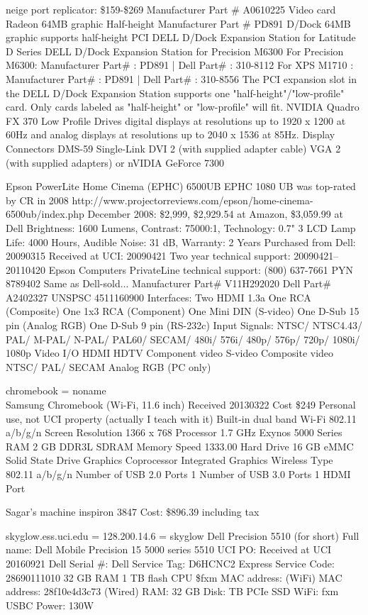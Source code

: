 \documentclass[12pt,twoside]{article}
\begin{document}
neige port replicator: \$159-\$269
Manufacturer Part \# A0610225 Video card Radeon 64MB graphic Half-height 
Manufacturer Part \# PD891 D/Dock 64MB graphic supports half-height PCI
DELL D/Dock Expansion Station for Latitude D Series
DELL D/Dock Expansion Station for Precision M6300
For Precision M6300: Manufacturer Part\# : PD891 | Dell Part\# : 310-8112
For XPS M1710      : Manufacturer Part\# : PD891 | Dell Part\# : 310-8556
The PCI expansion slot in the DELL D/Dock Expansion Station 
supports one "half-height"/"low-profile" card. 
Only cards labeled as "half-height" or "low-profile" will fit.
NVIDIA Quadro FX 370 Low Profile
Drives digital displays at resolutions up to 1920 x 1200 at 60Hz and
analog displays at resolutions up to 2040 x 1536 at 85Hz. 
Display Connectors 	DMS-59
Single-Link DVI 	2 (with supplied adapter cable)
VGA 	2 (with supplied adapters)
or nVIDIA GeForce 7300

Epson PowerLite Home Cinema (EPHC) 6500UB
EPHC 1080 UB was top-rated by CR in 2008
http://www.projectorreviews.com/epson/home-cinema-6500ub/index.php
December 2008: \$2,999, \$2,929.54 at Amazon, \$3,059.99 at Dell
Brightness: 1600 Lumens, Contrast: 75000:1, Technology: 0.7" 3 LCD
Lamp Life: 4000 Hours, Audible Noise: 31 dB, Warranty: 2 Years
Purchased from Dell: 20090315
Received at UCI: 20090421
Two year technical support: 20090421--20110420
Epson Computers PrivateLine technical support: (800) 637-7661 PYN 8789402
Same as Dell-sold...
Manufacturer Part\# V11H292020
Dell Part\# A2402327
UNSPSC 4511160900
Interfaces:
Two HDMI 1.3a
One RCA (Composite)
One 1x3 RCA (Component)
One Mini DIN (S-video)
One D-Sub 15 pin (Analog RGB)
One D-Sub 9 pin (RS-232c)
Input Signals:
NTSC/ NTSC4.43/ PAL/ M-PAL/ N-PAL/ PAL60/ SECAM/ 480i/ 576i/ 480p/ 576p/ 720p/ 1080i/ 1080p
Video I/O
HDMI
HDTV
Component video
S-video
Composite video
NTSC/ PAL/ SECAM
Analog RGB (PC only)

chromebook = noname \\
Samsung Chromebook (Wi-Fi, 11.6 inch)
Received 20130322
Cost \$249
Personal use, not UCI property (actually I teach with it)
Built-in dual band Wi-Fi 802.11 a/b/g/n
Screen Resolution	1366 x 768
Processor	1.7 GHz Exynos 5000 Series
RAM	2 GB DDR3L SDRAM
Memory Speed	1333.00
Hard Drive	16 GB eMMC Solid State Drive
Graphics Coprocessor	Integrated Graphics
Wireless Type	802.11 a/b/g/n
Number of USB 2.0 Ports	1
Number of USB 3.0 Ports	1
HDMI Port

Sagar's machine
inspiron 3847
Cost: \$896.39 including tax

skyglow.ess.uci.edu = 128.200.14.6 = skyglow
Dell Precision 5510 (for short)
Full name: Dell Mobile Precision 15 5000 series 5510
UCI PO: 
Received at UCI 20160921
Dell Serial \#: 
Dell Service Tag: D6HCNC2
Express Service Code: 28690111010
32 GB RAM
1 TB flash
CPU 
\$fxm
MAC address:  (WiFi)
MAC address: 28f10e4d3c73 (Wired)
RAM: 32 GB 
Disk:  TB PCIe SSD
WiFi: fxm
USBC
Power: 130W
\end{document}
